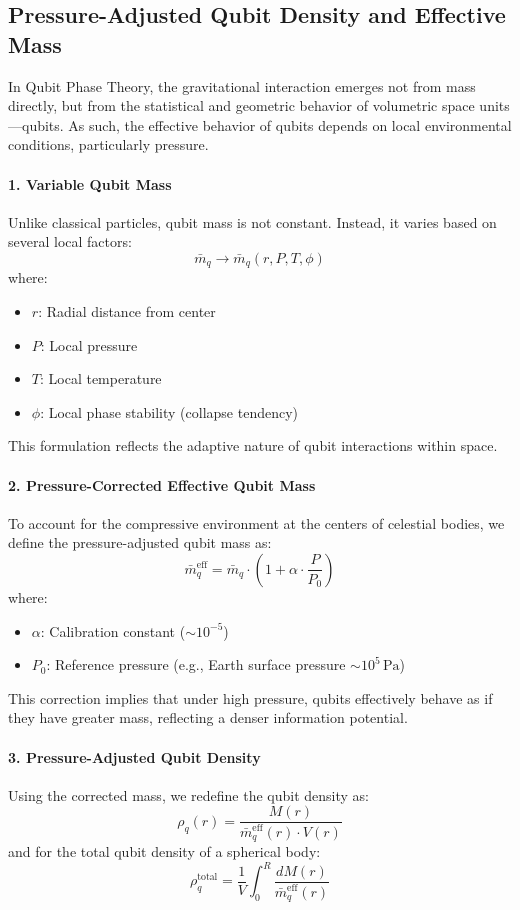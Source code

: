 \documentclass[12pt]{report} %
\begin{document}
\subsection{Pressure-Adjusted Qubit Density and Effective Mass}

In Qubit Phase Theory, the gravitational interaction emerges not from mass directly, but from the statistical and geometric behavior of volumetric space units—qubits. As such, the effective behavior of qubits depends on local environmental conditions, particularly pressure.

\paragraph{1. Variable Qubit Mass}
Unlike classical particles, qubit mass is not constant. Instead, it varies based on several local factors:
\[
\bar{m}_q \rightarrow \bar{m}_q(r, P, T, \phi)
\]
where:
\begin{itemize}
  \item \( r \): Radial distance from center
  \item \( P \): Local pressure
  \item \( T \): Local temperature
  \item \( \phi \): Local phase stability (collapse tendency)
\end{itemize}
This formulation reflects the adaptive nature of qubit interactions within space.

\paragraph{2. Pressure-Corrected Effective Qubit Mass}
To account for the compressive environment at the centers of celestial bodies, we define the pressure-adjusted qubit mass as:
\[
\bar{m}_q^{\text{eff}} = \bar{m}_q \cdot \left(1 + \alpha \cdot \frac{P}{P_0} \right)
\]
where:
\begin{itemize}
  \item \( \alpha \): Calibration constant (\( \sim 10^{-5} \))
  \item \( P_0 \): Reference pressure (e.g., Earth surface pressure \( \sim 10^5 \, \text{Pa} \))
\end{itemize}
This correction implies that under high pressure, qubits effectively behave as if they have greater mass, reflecting a denser information potential.

\paragraph{3. Pressure-Adjusted Qubit Density}
Using the corrected mass, we redefine the qubit density as:
\[
\rho_q(r) = \frac{M(r)}{\bar{m}_q^{\text{eff}}(r) \cdot V(r)}
\]
and for the total qubit density of a spherical body:
\[
\rho_q^{\text{total}} = \frac{1}{V} \int_0^R \frac{dM(r)}{\bar{m}_q^{\text{eff}}(r)}
\]
\end{document}
